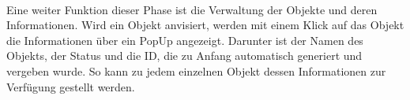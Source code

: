 \pagebreak
\\
Eine weiter Funktion dieser Phase ist die Verwaltung der Objekte und deren Informationen. Wird ein Objekt anvisiert, werden mit einem Klick auf das Objekt 
die Informationen über ein PopUp angezeigt. Darunter ist der Namen des Objekts, der Status und die ID, die zu Anfang automatisch generiert 
und vergeben wurde. So kann zu jedem einzelnen Objekt dessen Informationen zur Verfügung gestellt werden. 
\begin{figure}[hbt!]
    \centering

\end{figure}
